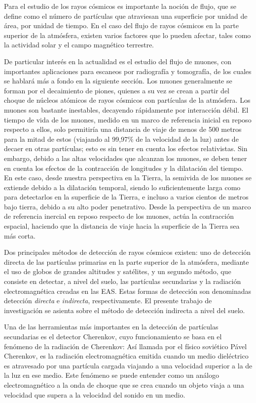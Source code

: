 \documentclass[12pt]{report}
\begin{document}
Para el estudio de los rayos cósmicos es importante la noción de flujo, que se define como el número de partículas que atraviesan una superficie por unidad de área, por unidad de tiempo. En el caso del flujo de rayos cósmicos en la parte superior de la atmósfera, existen varios factores que lo pueden afectar, tales como la actividad solar y el campo magnético terrestre. \cite{PhysRevD.98.030001}

De particular interés en la actualidad es el estudio del flujo de muones, con importantes aplicaciones para escaneos por radiografía y tomografía, de los cuales se hablará más a fondo en la siguiente sección. Los muones generalmente se forman por el decaimiento de piones, quienes a su vez se crean a partir del choque de núcleos atómicos de rayos cósmicos con partículas de la atmósfera. Los muones son bastante inestables, decayendo rápidamente por interacción débil. El tiempo de vida de los muones, medido en un marco de referencia inicial en reposo respecto a ellos, solo permitiría una distancia de viaje de menos de 500 metros para la mitad de estos (viajando al 99,97\% de la velocidad de la luz) antes de decaer en otras partículas; esto es sin tener en cuenta los efectos relativistas. Sin embargo, debido a las altas velocidades que alcanzan los muones, se deben tener en cuenta los efectos de la contracción de longitudes y la dilatación del tiempo. En este caso, desde nuestra perspectiva en la Tierra, la semivida de los muones se extiende debido a la dilatación temporal, siendo lo suficientemente larga como para detectarlos en la superficie de la Tierra, e incluso a varios cientos de metros bajo tierra, debido a su alto poder penetrativo. Desde la perspectiva de un marco de referencia inercial en reposo respecto de los muones, actúa la contracción espacial, haciendo que la distancia de viaje hacia la superficie de la Tierra sea más corta. \cite{cunningham2019high}

Dos principales métodos de detección de rayos cósmicos existen: uno de detección directa de las partículas primarias en la parte superior de la atmósfera, mediante el uso de globos de grandes altitudes y satélites, y un segundo método, que consiste en detectar, a nivel del suelo, las partículas secundarias y la radiación electromagnética creadas en las EAS. Estas formas de detección son denominadas detección \textit{directa} e \textit{indirecta}, respectivamente. El presente trabajo de investigación se asienta sobre el método de detección indirecta a nivel del suelo.

Una de las herramientas más importantes en la detección de partículas secundarias es el detector Cherenkov, cuyo funcionamiento se basa en el fenómeno de la radiación de Cherenkov: Así llamada por el físico soviético Pável Cherenkov, es la radiación electromagnética emitida cuando un medio dieléctrico es atravesado por una partícula cargada viajando a una velocidad superior a la de la luz en ese medio. \cite{jelley1955cerenkov} Este fenómeno se puede entender como un análogo electromagnético a la onda de choque que se crea cuando un objeto viaja a una velocidad que supera a la velocidad del sonido en un medio.
\end{document}
